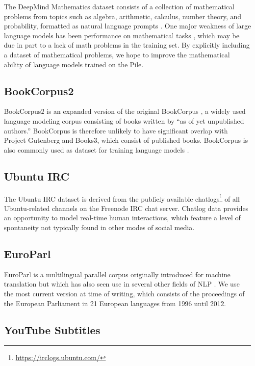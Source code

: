 The DeepMind Mathematics dataset consists of a collection of mathematical problems from topics such as algebra, arithmetic, calculus, number theory, and probability, formatted as natural language prompts \citep{dm-mathematics}. One major weakness of large language models has been performance on mathematical tasks \citep{GPT3}, which may be due in part to a lack of math problems in the training set. By explicitly including a dataset of mathematical problems, we hope to improve the mathematical ability of language models trained on the Pile.

\subsection{BookCorpus2}

BookCorpus2 is an expanded version of the original BookCorpus \citep{BookCorpus}, a widely used language modeling corpus consisting of books written by ``as of yet unpublished authors.'' BookCorpus is therefore unlikely to have significant overlap with Project Gutenberg and Books3, which consist of published books. BookCorpus is also commonly used as dataset for training language models \citep{GPT, BERT, RoBERTa}.

\subsection{Ubuntu IRC}

The Ubuntu IRC dataset is derived from the publicly available chatlogs\footnote{\url{https://irclogs.ubuntu.com/}} of all Ubuntu-related channels on the Freenode IRC chat server. Chatlog data provides an opportunity to model real-time human interactions, which feature a level of spontaneity not typically found in other modes of social media. 

\subsection{EuroParl}

EuroParl \citep{EuroParl} is a multilingual parallel corpus originally introduced for machine translation but which has also seen use in several other fields of NLP \citep{EuroParl-example1,EuroParl-example2,EuroParl-example3}. We use the most current version at time of writing, which consists of the proceedings of the European Parliament in 21 European languages from 1996 until 2012.

\subsection{YouTube Subtitles}

